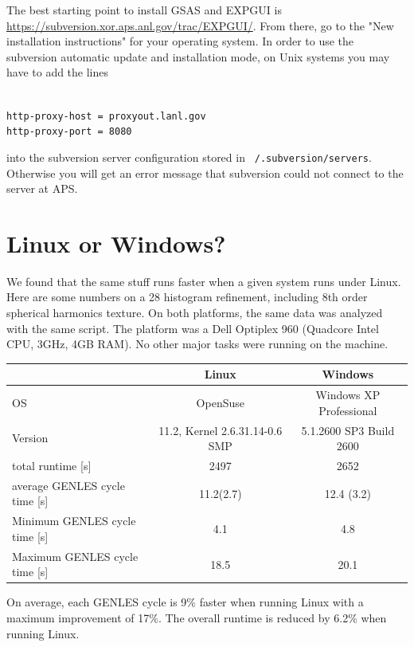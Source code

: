 The best starting point to install GSAS and EXPGUI is \url{https://subversion.xor.aps.anl.gov/trac/EXPGUI/}. From there, go to the "New installation instructions" for your operating system. In order to use the subversion automatic update and installation mode, on Unix systems you may have to add the lines

\texttt{\\
http-proxy-host = proxyout.lanl.gov\\
http-proxy-port = 8080\\
}

into the subversion server configuration stored in \texttt{~/.subversion/servers}. Otherwise you will get an error message that subversion could not connect to the server at APS.


\section{Linux or Windows?}

We found that the same stuff runs faster when a given system runs under Linux. Here are some numbers on a 28 histogram refinement, including 8th order spherical harmonics texture. On both platforms, the same data was analyzed with the same script. The platform was a Dell Optiplex 960 (Quadcore Intel CPU, 3GHz, 4GB RAM). No other major tasks were running on the machine.

\begin{tabular}{|l|c|c|}
\hline
&Linux&Windows\\
\hline
OS&OpenSuse&Windows XP Professional\\
Version&11.2, Kernel 2.6.31.14-0.6 SMP&5.1.2600 SP3 Build 2600\\
total runtime [s]&2497&2652\\
average GENLES cycle time [s]&11.2(2.7)&12.4 (3.2)\\
Minimum GENLES cycle time [s]&4.1&4.8\\
Maximum GENLES cycle time [s]&18.5&20.1\\
\hline
\end{tabular}

On average, each GENLES cycle is 9\% faster when running Linux with a maximum improvement of 17\%. The overall runtime is reduced by 6.2\% when running Linux.

